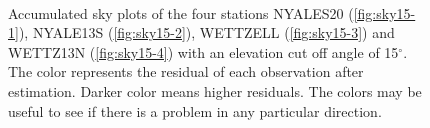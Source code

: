 \documentclass[twoside=semi,fontsize=12pt,paper=a4,titlepage=on]{kv_article}
\begin{document}
\begin{figure}
	 \\
    \caption{Accumulated sky plots of the four stations NYALES20 (\ref{fig:sky15-1}), NYALE13S (\ref{fig:sky15-2}), WETTZELL (\ref{fig:sky15-3}) and WETTZ13N (\ref{fig:sky15-4}) with an elevation cut off angle of 15$^\circ$. The color represents the residual of each observation after estimation. Darker color means higher residuals. The colors may be useful to see if there is a problem in any particular direction.}
	\label{fig:sky15}
\end{figure}
\end{document}
